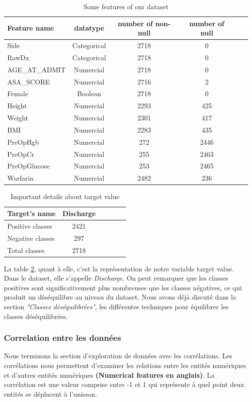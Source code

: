 \documentclass[12pt, french]{article}
\begin{document}
\begin{table}[h]
\centering
\begin{tabular}{|l|c|c|c|c|c|}
\hline
Feature name & datatype & number of non-null & number of null \\
\hline
Side & Categorical & 2718 & 0  & \\
RawDx & Categorical & 2718 & 0\\
AGE\_AT\_ADMIT & Numercial & 2718 & 0 \\
ASA\_SCORE & Numercial & 2716 & 2\\
Female & Boolean & 2718 & 0\\
Height & Numercial & 2293 & 425  \\
Weight & Numercial & 2301 & 417 \\
BMI & Numercial & 2283 & 435 \\
PreOpHgb & Numercial & 272 &  2446\\
PreOpCr & Numercial & 255 & 2463 \\
PreOpGlucose & Numercial & 253 & 2465  \\
Warfarin & Numercial & 2482 &  236\\
\hline
\end{tabular}
\caption{Some features of our dataset}
\label{tab:features}
\end{table}

\begin{table}[h]
\centering
\begin{tabular}{|l|c|c|c|c|c|}
\hline
Target's name & Discharge \\
\hline
Positive classes & 2421\\
\hline
Negative classes & 297\\
\hline
Total classes & 2718\\
\hline
\end{tabular}
\caption{Important details about target value}
\label{tab:target}
\end{table}

La table \ref{tab:target}, quant à elle, c'est la représentation de notre variable target value. Dans le dataset, elle s'appelle \textit{Discharge}. On peut remarquer que les classes positives sont significativement plus nombreuses que les classes négatives, ce qui produit un déséquilibre au niveau du dataset. Nous avons déjà discuté dans la section\textit{ "Classes déséquilibrées"}, les différentes techniques pour équilibrer les classes déséquilibrées.

\subsubsection{Correlation entre les données}
Nous terminons la section d'exploration de données avec les corrélations. Les corrélations nous permettent d'examiner les relations entre les entités numériques et d'autres entités numériques \textbf{(Numerical features en anglais)}. La corrélation est une valeur comprise entre -1 et 1 qui représente à quel point deux entités se déplacent à l'unisson. \\
\end{document}
